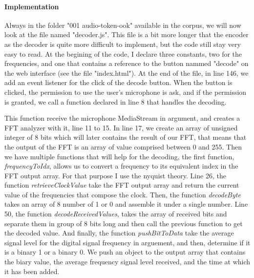 \documentclass[twocolumn,14pt]{extarticle}
\begin{document}
\paragraph{Implementation}
Always in the folder "001 audio-token-ook" available in the corpus, we will now look at the file named "decoder.js". This file is a bit more longer that the encoder as the decoder is quite more difficult to implement, but the code still stay very easy to read. At the begining of the code, I declare three constants, two for the frequencies, and one that contains a reference to the button nammed "decode" on the web interface (see the file "index.html"). At the end of the file, in line 146, we add an event listener for the click of the decode button. When the button is clicked, the permission to use the user's microphone is ask, and if the permission is granted, we call a function declared in line 8 that handles the decoding.

This function receive the microphone MediaStream in argument, and creates a FFT analyzer with it, line 11 to 15. In line 17, we create an array of unsigned integer of 8 bits which will later contains the result of our FFT, that means that the output of the FFT is an array of value comprised between 0 and 255. Then we have multiple functions that will help for the decoding, the first function, \textit{frequencyToIdx}, allows us to convert a frequency to its equivalent index in the FFT output array.  For that purpose I use the nyquist theory. Line 26, the function \textit{retrieveClockValue} take the FFT output array and return the current value of the frequencies that compose the clock. Then, the function \textit{decodeByte} takes an array of 8 number of 1 or 0 and assemble it under a single number. Line 50, the function \textit{decodeReceivedValues}, takes the array of received bits and separate them in group of 8 bits long and then call the previous function to get the decoded value. And finally, the function \textit{pushBitToData} take the average signal level for the digital signal frequency in arguement, and then, determine if it is a binary 1 or a binary 0. We push an object to the output array that contains the biary value, the average frequency signal level received, and the time at which it has been added.
\end{document}
